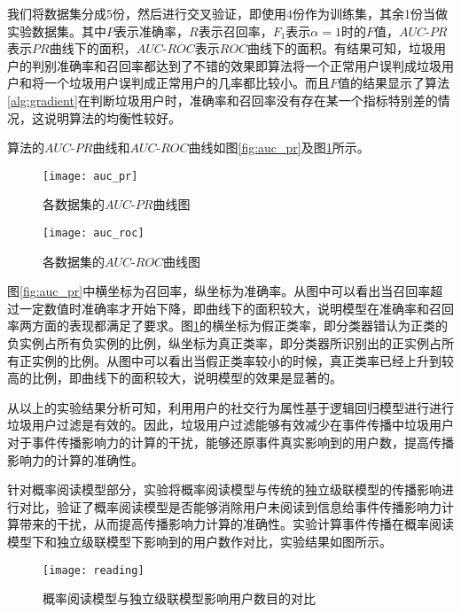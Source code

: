 我们将数据集分成5份，然后进行交叉验证，即使用4份作为训练集，其余1份当做实验数据集。其中$P$表示准确率，$R$表示召回率，$F_1$表示$\alpha = 1$时的$F$值，$AUC$-$PR$表示$PR$曲线下的面积，$AUC$-$ROC$表示$ROC$曲线下的面积。有结果可知，垃圾用户的判别准确率和召回率都达到了不错的效果即算法将一个正常用户误判成垃圾用户和将一个垃圾用户误判成正常用户的几率都比较小。而且$F$值的结果显示了算法\ref{alg:gradient}在判断垃圾用户时，准确率和召回率没有存在某一个指标特别差的情况，这说明算法的均衡性较好。

算法的$AUC$-$PR$曲线和$AUC$-$ROC$曲线如图\ref{fig:auc_pr}及图\ref{fig:auc_roc}所示。

\begin{figure}[!ht]
   \begin{minipage}{0.48\textwidth}
     \centering
     \texttt{[image: auc\_pr]}
     \caption{各数据集的$AUC$-$PR$曲线图}
     \label{fig:auc_pr}
   \end{minipage}
   \hfill
   \begin {minipage}{0.48\textwidth}
     \centering
     \texttt{[image: auc\_roc]}
     \caption{各数据集的$AUC$-$ROC$曲线图}
     \label{fig:auc_roc}
   \end{minipage}
\end{figure}

图\ref{fig:auc_pr}中横坐标为召回率，纵坐标为准确率。从图中可以看出当召回率超过一定数值时准确率才开始下降，即曲线下的面积较大，说明模型在准确率和召回率两方面的表现都满足了要求。图\ref{fig:auc_roc}的横坐标为假正类率，即分类器错认为正类的负实例占所有负实例的比例，纵坐标为真正类率，即分类器所识别出的正实例占所有正实例的比例。从图中可以看出当假正类率较小的时候，真正类率已经上升到较高的比例，即曲线下的面积较大，说明模型的效果是显著的。

从以上的实验结果分析可知，利用用户的社交行为属性基于逻辑回归模型进行进行垃圾用户过滤是有效的。因此，垃圾用户过滤能够有效减少在事件传播中垃圾用户对于事件传播影响力的计算的干扰，能够还原事件真实影响到的用户数，提高传播影响力的计算的准确性。

针对概率阅读模型部分，实验将概率阅读模型与传统的独立级联模型的传播影响进行对比，验证了概率阅读模型是否能够消除用户未阅读到信息给事件传播影响力计算带来的干扰，从而提高传播影响力计算的准确性。实验计算事件传播在概率阅读模型下和独立级联模型下影响到的用户数作对比，实验结果如图所示。

\begin{figure}[!ht]
    \centering
    \texttt{[image: reading]}
    \caption{概率阅读模型与独立级联模型影响用户数目的对比}
    \label{fig:reading}
\end{figure}

